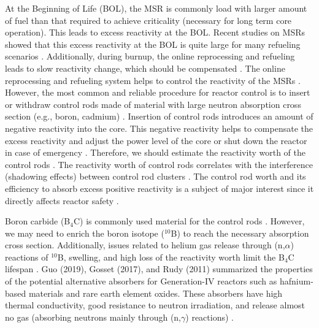 At the Beginning of Life (BOL), the MSR is commonly load with larger amount of 
fuel than that required to achieve criticality (necessary for long term core 
operation). This leads to excess reactivity at the BOL. Recent studies on MSRs showed that this excess reactivity 
at the BOL is quite large for many refueling scenarios 
\cite{ashraf2020Strategies,ashraf2019whole_core,rykhlevskii2019modeling,betzler2016modeling,ashraf2018nuclear,ashraf2019modeling}.
Additionally, during burnup, the online 
reprocessing and refueling leads to slow reactivity change, which 
should be compensated \cite{ashraf2020Strategies,ashraf2019whole_core}. 
The online reprocessing and refueling system helps to control the reactivity of 
the MSRs \cite{ashraf2019whole_core}. However, the most common and reliable procedure 
for reactor control is to insert or withdraw control rods made of material 
with large neutron absorption cross section (e.g., boron, cadmium) 
\cite{duderstadt650nuclear}. 
Insertion of control rods introduces an amount of negative reactivity into the 
core. This negative reactivity helps to compensate the excess reactivity and 
adjust the power level of the core or shut down the reactor in case of  
emergency \cite{glasstone1967nuclear}. Therefore, we should estimate 
the reactivity worth of the control rods 
\cite{varvayanni2009estimation,fadaei2009control,aoyama2007core,bretscher1997computing}.
 The reactivity worth of control rods correlates with the interference 
(shadowing effects) between control rod clusters 
\cite{girardin2008development,vcerba2017optimization}. 
The control rod worth and its efficiency to absorb excess positive reactivity is a subject of major interest since it directly affects reactor safety \cite{liu2018criticality,atkinson2019small,vcerba2017optimization,do2019criticality,guo2019advanced,varvayanni2009estimation}.

Boron carbide (B$_4$C) is commonly used material for the control rods 
\cite{zhong2019preliminary,steinbruck2010degradation,dunner1984absorber}. 
However, we may need to enrich the boron isotope ($^{10}$B) to reach 
the necessary absorption cross section. Additionally, issues related to helium gas release through (n,$\alpha$) reactions of $^{10}$B, swelling,
and high loss of the reactivity worth limit the B$_4$C lifespan 
\cite{guo2019optimized}. Guo (2019), Gosset (2017), and Rudy (2011) summarized the properties of the 
potential alternative absorbers for Generation-IV reactors such as 
hafnium-based materials and rare earth element oxides. These absorbers have 
high thermal conductivity, good resistance to neutron irradiation, and release 
almost no gas (absorbing neutrons mainly through (n,$\gamma$) reactions)
\cite{guo2019optimized,gosset2017absorber,konings2011comprehensive}.

